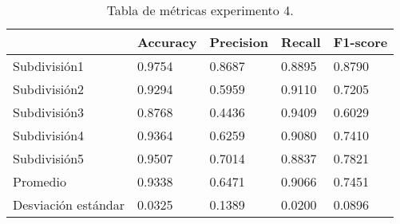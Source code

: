 \begin{table}[H]
\centering
\begin{tabular}{|l|llll|}
\hline
              & Accuracy &     Precision &     Recall  &   F1-score \\ \hline
              
Subdivisión1            &       0.9754  &       0.8687  &       0.8895  &       0.8790  \\ 
Subdivisión2            &       0.9294  &       0.5959  &       0.9110  &       0.7205  \\ 
Subdivisión3            &       0.8768  &       0.4436  &       0.9409  &       0.6029  \\ 
Subdivisión4            &       0.9364  &       0.6259  &       0.9080  &       0.7410  \\ 
Subdivisión5            &       0.9507  &       0.7014  &       0.8837  &       0.7821  \\ \hline
Promedio                &       0.9338  &       0.6471  &       0.9066  &       0.7451  \\ \hline
Desviación estándar     &       0.0325  &       0.1389  &       0.0200  &       0.0896  \\ \hline



\end{tabular}
\caption{Tabla de métricas experimento 4.}
		     \label{tab:exp4}
\end{table}